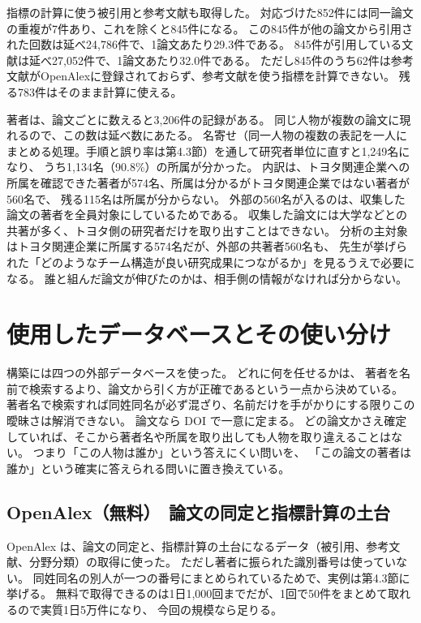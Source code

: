 \documentclass[a4paper,10pt]{ltjsarticle}
\begin{document}
指標の計算に使う被引用と参考文献も取得した。
対応づけた852件には同一論文の重複が7件あり、これを除くと845件になる。
この845件が他の論文から引用された回数は延べ24,786件で、1論文あたり29.3件である。
845件が引用している文献は延べ27,052件で、1論文あたり32.0件である。
ただし845件のうち62件は参考文献がOpenAlexに登録されておらず、参考文献を使う指標を計算できない。
残る783件はそのまま計算に使える。

著者は、論文ごとに数えると3,206件の記録がある。
同じ人物が複数の論文に現れるので、この数は延べ数にあたる。
名寄せ（同一人物の複数の表記を一人にまとめる処理。手順と誤り率は第4.3節）を通して研究者単位に直すと1,249名になり、
うち1,134名（90.8\%）の所属が分かった。
内訳は、トヨタ関連企業への所属を確認できた著者が574名、所属は分かるがトヨタ関連企業ではない著者が560名で、
残る115名は所属が分からない。
外部の560名が入るのは、収集した論文の著者を全員対象にしているためである。
収集した論文には大学などとの共著が多く、トヨタ側の研究者だけを取り出すことはできない。
分析の主対象はトヨタ関連企業に所属する574名だが、外部の共著者560名も、
先生が挙げられた「どのようなチーム構造が良い研究成果につながるか」を見るうえで必要になる。
誰と組んだ論文が伸びたのかは、相手側の情報がなければ分からない。

\section{使用したデータベースとその使い分け}

構築には四つの外部データベースを使った。
どれに何を任せるかは、
著者を名前で検索するより、論文から引く方が正確であるという一点から決めている。
著者名で検索すれば同姓同名が必ず混ざり、名前だけを手がかりにする限りこの曖昧さは解消できない。
論文なら DOI で一意に定まる。
どの論文かさえ確定していれば、そこから著者名や所属を取り出しても人物を取り違えることはない。
つまり「この人物は誰か」という答えにくい問いを、
「この論文の著者は誰か」という確実に答えられる問いに置き換えている。

\subsection{OpenAlex（無料）　論文の同定と指標計算の土台}

OpenAlex は、論文の同定と、指標計算の土台になるデータ（被引用、参考文献、分野分類）の取得に使った。
ただし著者に振られた識別番号は使っていない。
同姓同名の別人が一つの番号にまとめられているためで、実例は第4.3節に挙げる。
無料で取得できるのは1日1,000回までだが、1回で50件をまとめて取れるので実質1日5万件になり、
今回の規模なら足りる。
\end{document}
